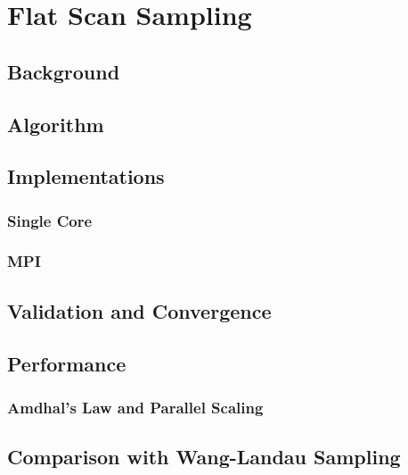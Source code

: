 \chapter{Flat Scan Sampling}

\section{Background}


\section{Algorithm}


\section{Implementations}

\subsection{Single Core}

\subsection{MPI}


\section{Validation and Convergence}


\section{Performance}

\subsection{Amdhal's Law and Parallel Scaling}


\section{Comparison with Wang-Landau Sampling}
